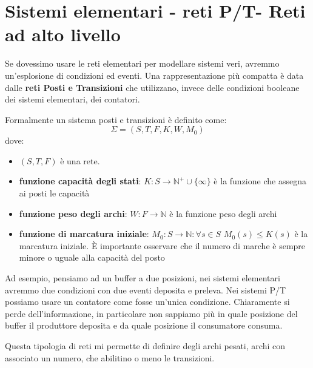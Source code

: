 \section{Sistemi elementari - reti P/T- Reti ad alto livello}
Se dovessimo usare le reti elementari per modellare sistemi veri, avremmo
un'esplosione di condizioni ed eventi. Una rappresentazione più compatta è data
dalle \textbf{reti Posti e Transizioni} che utilizzano, invece delle condizioni
booleane dei sistemi elementari, dei contatori.
\begin{definizione}
    Formalmente un sistema posti e transizioni è definito come:
    \begin{equation}
        \Sigma = (S, T, F, K, W, M_0)
    \end{equation}
    dove:
    \begin{itemize}
        \item $(S, T, F)$ è una rete.
        \item \textbf{funzione capacità degli stati}: $K: S \to \mathbb{N}^+
                  \cup \{\infty\}$ è la funzione che assegna ai posti le capacità
        \item \textbf{funzione peso degli archi}: $W: F \to \mathbb{N}$ è la
              funzione peso degli archi
        \item \textbf{funzione di marcatura iniziale}: $M_0: S \to \mathbb{N}:
                  \forall s \in S$ $M_0(s) \leq K(s)$ è la marcatura iniziale.
              È importante osservare che il numero di marche è sempre minore o
              uguale alla capacità del posto
    \end{itemize}
\end{definizione}
Ad esempio, pensiamo ad un buffer a due posizioni, nei sistemi elementari avremmo
due condizioni con due eventi deposita e preleva. Nei sistemi P/T possiamo usare
un contatore come fosse un'unica condizione. Chiaramente si perde dell'informazione,
in particolare non sappiamo più in quale posizione del buffer il produttore
deposita e da quale posizione il consumatore consuma.

Questa tipologia di reti mi permette di definire degli archi pesati, archi con
associato un numero, che abilitino o meno le transizioni.

